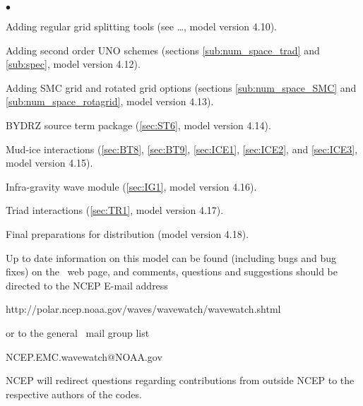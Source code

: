 \begin{list}{$\bullet$}{\rightmargin 5mm \parsep 0mm \itemsep 0mm}
\item Adding regular grid splitting tools (see \para\ldots, model version
  4.10).

\item Adding second order UNO schemes (sections \ref{sub:num_space_trad} and
  \ref{sub:spec}, model version 4.12).

\item Adding SMC grid and rotated grid options (sections
  \ref{sub:num_space_SMC} and \ref{sub:num_space_rotagrid}, model version
  4.13).

\item BYDRZ source term package (\para\ref{sec:ST6}, model version 4.14).

\item Mud-ice interactions (\para\ref{sec:BT8}, \ref{sec:BT9},
 \ref{sec:ICE1}, \ref{sec:ICE2}, and \ref{sec:ICE3}, model version 4.15).

\item Infra-gravity wave module (\para\ref{sec:IG1}, model version 4.16).

\item Triad interactions (\para\ref{sec:TR1}, model version 4.17).



\item Final preparations for distribution (model version 4.18).

\end{list}

\vspace{\baselineskip} \noindent 
Up to date information on this model can be found (including bugs and bug
fixes) on the \ws\ web page, and comments, questions and suggestions should be
directed to the NCEP E-mail address

\begin{center}
http://polar.ncep.noaa.gov/waves/wavewatch/wavewatch.shtml
\end{center}

\noindent
or to the general \ws\ mail group list

\begin{center}
NCEP.EMC.wavewatch@NOAA.gov
\end{center}

\noindent
NCEP will redirect questions regarding contributions from outside NCEP to the
respective authors of the codes.
